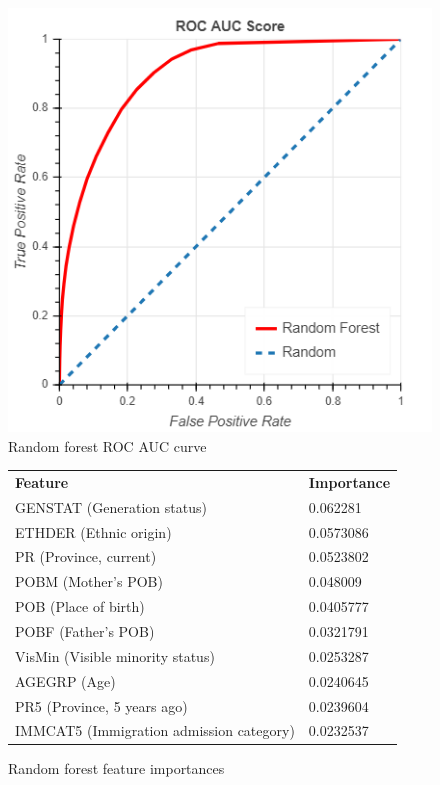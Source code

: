 \documentclass[10pt, conference, compsocconf]{IEEEtran}
\begin{document}
\begin{figure}
  \includegraphics[scale=0.45]{random_forest_roc}
  \centering
  \caption{Random forest ROC AUC curve}
  \label{fig:random_forest_roc}
\end{figure}

\begin{figure}
  \begin{tabular}{ll}
    \textbf{Feature}                          & \textbf{Importance} \\
    GENSTAT (Generation status)               & 0.062281 \\
    ETHDER (Ethnic origin)                    & 0.0573086 \\
    PR (Province, current)                    & 0.0523802 \\
    POBM (Mother's POB)                       & 0.048009 \\
    POB (Place of birth)                      & 0.0405777 \\
    POBF (Father's POB)                       & 0.0321791 \\
    VisMin (Visible minority status)          & 0.0253287 \\
    AGEGRP (Age)                              & 0.0240645 \\
    PR5 (Province, 5 years ago)               & 0.0239604 \\
    IMMCAT5 (Immigration admission category)  & 0.0232537
  \end{tabular}
  \caption{Random forest feature importances}
  \label{fig:random_forest_importances}
\end{figure}
\end{document}
